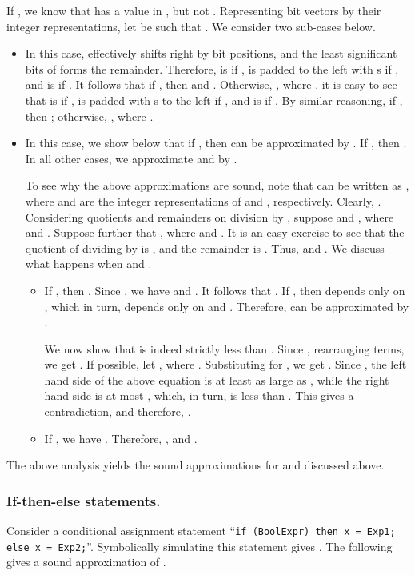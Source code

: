 \documentclass{llncs}
\begin{document}
If , we know that  has a value in , but not .  Representing bit vectors by their
integer representations, let  be such that
.  We consider two
sub-cases below.
\begin{itemize}
\item  In this case,  effectively
  shifts  right by  bit positions, and the least significant 
  bits of  forms the remainder.
  Therefore,  is  if , is  padded to the left with  s if , and is  if .
  It follows that if , then 
  and .  Otherwise, , where .
it is easy to see that  is
 if , is  padded with  s to the
left if , and is  if .  
  By similar reasoning, if , then
;  otherwise, , where .
\item  In this case, we show below that
  if , then  can be approximated
  by .  If , then .  In all other cases, we approximate  and
   by .

  To see why the above approximations are sound, note that
   can be written as , where  and
   are the integer representations of  and ,
  respectively.  Clearly, .  Considering quotients
  and remainders on division by , suppose  and , where  and .  Suppose further that
  , where  and .  It is an easy exercise to see that the
  quotient of dividing  by  is , and the remainder is .  Thus,  and .  We discuss what
  happens when  and .
  \begin{itemize}
    \item If , then .  Since
      , we have  and .  It
      follows that .  If , then
       depends only on , which in turn, depends only
      on  and .  Therefore, 
      can be approximated by .

      We now show that  is indeed strictly less than .
      Since ,
      rearranging terms, we get .  If possible, let , where .
      Substituting for , we get .  Since , the
      left hand side of the above equation is at least as large as , while the right hand side is at most , which, in
      turn, is less than .  This gives a contradiction, and
      therefore, .
    \item If , we have .
      Therefore, , and .
  \end{itemize}
\end{itemize}
The above analysis yields the sound approximations for
 and  discussed above.

\subsubsection{If-then-else statements.} Consider a conditional
assignment statement ``{\tt if (BoolExpr) then x = Exp1; else x =
  Exp2;}''.  Symbolically simulating this statement gives .  The
following gives a sound approximation of . 
\end{document}
